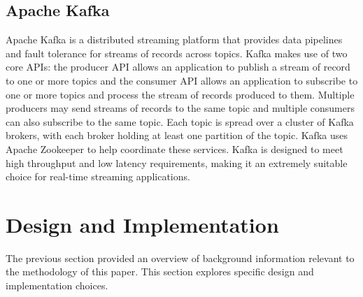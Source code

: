 \documentclass{article}
\begin{document}
\subsection{Apache Kafka}
Apache Kafka is a distributed streaming platform that provides data pipelines and fault tolerance for streams of records across topics. Kafka makes use of two core APIs: the producer API allows an application to publish a stream of record to one or more topics and the consumer API allows an application to subscribe to one or more topics and process the stream of records produced to them. Multiple producers may send streams of records to the same topic and multiple consumers can also subscribe to the same topic. Each topic is spread over a cluster of Kafka brokers, with each broker holding at least one partition of the topic. Kafka uses Apache Zookeeper to help coordinate these services. Kafka is designed to meet high throughput and low latency requirements, making it an extremely suitable choice for real-time streaming applications. 
\section{Design and Implementation}
The previous section provided an overview of background information relevant to the methodology of this paper. This section explores specific design and implementation choices. 
\end{document}
